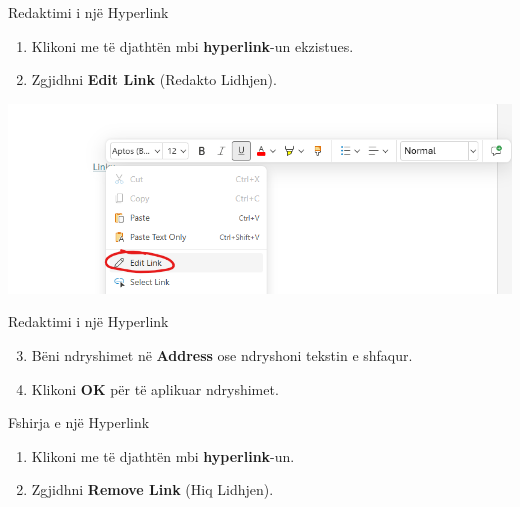 \documentclass[
  ignorenonframetext,
]{beamer}
\begin{document}
\begin{frame}{Redaktimi i një Hyperlink}
\label{redaktimi-i-njuxeb-hyperlink}
\begin{enumerate}
\item
  Klikoni me të djathtën mbi \textbf{hyperlink}-un ekzistues.
\item
  Zgjidhni \textbf{Edit Link} (Redakto Lidhjen).
\end{enumerate}

\includegraphics{./images/word11.png}
\end{frame}

\begin{frame}{Redaktimi i një Hyperlink}
\label{redaktimi-i-njuxeb-hyperlink-1}
\begin{enumerate}
\setcounter{enumi}{2}
\item
  Bëni ndryshimet në \textbf{Address} ose ndryshoni tekstin e shfaqur.
\item
  Klikoni \textbf{OK} për të aplikuar ndryshimet.
\end{enumerate}
\end{frame}

\begin{frame}{Fshirja e një Hyperlink}
\label{fshirja-e-njuxeb-hyperlink}
\begin{enumerate}
\item
  Klikoni me të djathtën mbi \textbf{hyperlink}-un.
\item
  Zgjidhni \textbf{Remove Link} (Hiq Lidhjen).
\end{enumerate}
\end{frame}
\end{document}
